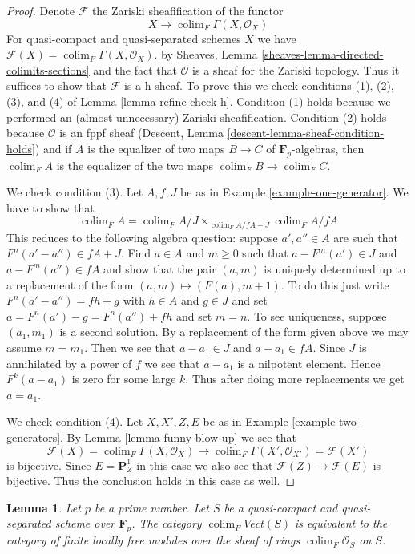 \documentclass[10pt,a4paper]{amsart}
\theoremstyle{plain}
\newtheorem{lemma}[subsection]{Lemma}
\theoremstyle{definition}
\theoremstyle{remark}
\numberwithin{equation}{subsection}
\def\colim{\mathop{\mathrm{colim}}\nolimits}
\begin{document}
\begin{proof}
Denote $\mathcal{F}$ the Zariski sheafification
of the functor
$$
X \longrightarrow \colim_F \Gamma(X, \mathcal{O}_X)
$$
For quasi-compact and quasi-separated schemes $X$
we have $\mathcal{F}(X) = \colim_F \Gamma(X, \mathcal{O}_X)$.
by Sheaves, Lemma \ref{sheaves-lemma-directed-colimits-sections}
and the fact that $\mathcal{O}$ is a sheaf for the Zariski topology.
Thus it suffices to show that $\mathcal{F}$ is a h sheaf.
To prove this we check conditions (1), (2), (3), and (4) of
Lemma \ref{lemma-refine-check-h}.
Condition (1) holds because we performed an (almost unnecessary)
Zariski sheafification. Condition (2) holds because
$\mathcal{O}$ is an fppf sheaf (Descent, Lemma
\ref{descent-lemma-sheaf-condition-holds}) and if
$A$ is the equalizer of two maps $B \to C$ of $\mathbf{F}_p$-algebras,
then $\colim_F A$ is the equalizer of the two maps
$\colim_F B \to \colim_F C$.

\medskip\noindent
We check condition (3). Let $A, f, J$ be as in
Example \ref{example-one-generator}.
We have to show that
$$
\colim_F A = \colim_F A/J \times_{\colim_F A/fA + J} \colim_F A/fA
$$
This reduces to the following algebra question: suppose $a', a'' \in A$
are such that $F^n(a' - a'') \in fA + J$. Find $a \in A$ and $m \geq 0$
such that $a - F^m(a') \in J$ and $a - F^m(a'') \in fA$ and show that
the pair $(a, m)$ is uniquely determined up to a replacement of the
form $(a, m) \mapsto (F(a), m + 1)$.
To do this just write $F^n(a' - a'') = f h + g$ with $h \in A$ and $g \in J$
and set $a = F^n(a') - g = F^n(a'') + fh$ and set $m = n$.
To see uniqueness, suppose $(a_1, m_1)$ is a second solution.
By a replacement of the form given above we may assume $m = m_1$.
Then we see that $a - a_1 \in J$ and $a - a_1 \in fA$.
Since $J$ is annihilated by a power of $f$ we see that
$a - a_1$ is a nilpotent element. Hence $F^k(a - a_1)$ is zero
for some large $k$. Thus after doing more replacements we get
$a = a_1$.

\medskip\noindent
We check condition (4). Let $X, X', Z, E$ be as in
Example \ref{example-two-generators}. By
Lemma \ref{lemma-funny-blow-up} we see that
$$
\mathcal{F}(X) = \colim_F \Gamma(X, \mathcal{O}_X)
\longrightarrow
\colim_F \Gamma(X', \mathcal{O}_{X'}) = \mathcal{F}(X')
$$
is bijective. Since $E = \mathbf{P}^1_Z$ in this case we also
see that $\mathcal{F}(Z) \to \mathcal{F}(E)$ is bijective.
Thus the conclusion holds in this case as well.
\end{proof}

\begin{lemma}
\label{lemma-colim-F-Vect}
Let $p$ be a prime number. Let $S$ be a quasi-compact and quasi-separated
scheme over $\mathbf{F}_p$. The category $\colim_F \textit{Vect}(S)$
is equivalent to the category of finite locally free modules
over the sheaf of rings $\colim_F \mathcal{O}_S$ on $S$.
\end{lemma}
\end{document}
